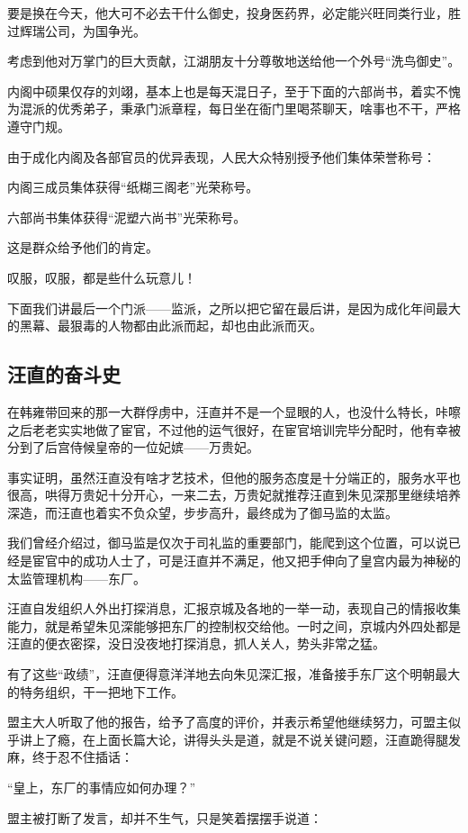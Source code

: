 \begin{multicols}{\theparacolNo}
		要是换在今天，他大可不必去干什么御史，投身医药界，必定能兴旺同类行业，胜过辉瑞公司，为国争光。

		考虑到他对万掌门的巨大贡献，江湖朋友十分尊敬地送给他一个外号“洗鸟御史”。

		内阁中硕果仅存的刘翊，基本上也是每天混日子，至于下面的六部尚书，着实不愧为混派的优秀弟子，秉承门派章程，每日坐在衙门里喝茶聊天，啥事也不干，严格遵守门规。

		由于成化内阁及各部官员的优异表现，人民大众特别授予他们集体荣誉称号：

		内阁三成员集体获得“纸糊三阁老”光荣称号。

		六部尚书集体获得“泥塑六尚书”光荣称号。

		这是群众给予他们的肯定。

		叹服，叹服，都是些什么玩意儿！

		下面我们讲最后一个门派——监派，之所以把它留在最后讲，是因为成化年间最大的黑幕、最狠毒的人物都由此派而起，却也由此派而灭。

		\subsection{汪直的奋斗史}
		在韩雍带回来的那一大群俘虏中，汪直并不是一个显眼的人，也没什么特长，咔嚓之后老老实实地做了宦官，不过他的运气很好，在宦官培训完毕分配时，他有幸被分到了后宫侍候皇帝的一位妃嫔——万贵妃。

		事实证明，虽然汪直没有啥才艺技术，但他的服务态度是十分端正的，服务水平也很高，哄得万贵妃十分开心，一来二去，万贵妃就推荐汪直到朱见深那里继续培养深造，而汪直也着实不负众望，步步高升，最终成为了御马监的太监。

		我们曾经介绍过，御马监是仅次于司礼监的重要部门，能爬到这个位置，可以说已经是宦官中的成功人士了，可是汪直并不满足，他又把手伸向了皇宫内最为神秘的太监管理机构——东厂。

		汪直自发组织人外出打探消息，汇报京城及各地的一举一动，表现自己的情报收集能力，就是希望朱见深能够把东厂的控制权交给他。一时之间，京城内外四处都是汪直的便衣密探，没日没夜地打探消息，抓人关人，势头非常之猛。

		有了这些“政绩”，汪直便得意洋洋地去向朱见深汇报，准备接手东厂这个明朝最大的特务组织，干一把地下工作。

		盟主大人听取了他的报告，给予了高度的评价，并表示希望他继续努力，可盟主似乎讲上了瘾，在上面长篇大论，讲得头头是道，就是不说关键问题，汪直跪得腿发麻，终于忍不住插话：

		“皇上，东厂的事情应如何办理？”

		盟主被打断了发言，却并不生气，只是笑着摆摆手说道：


\end{multicols}
